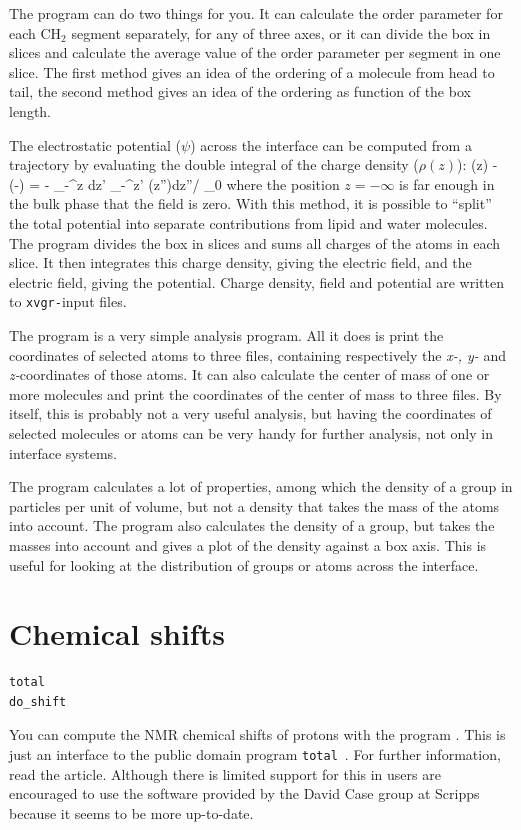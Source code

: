 {The program can do two things for you. It can calculate the order
parameter for each CH$_2$ segment separately, for any of three axes,
or it can divide the box in slices and calculate the average value of
the order parameter per segment in one slice. The first method gives
an idea of the ordering of a molecule from head to tail, the second
method gives an idea of the ordering as function of the box length.

The electrostatic potential ($\psi$) across the interface can be
computed from a trajectory by evaluating the double integral of the
charge density ($\rho(z)$):
\beq
\psi(z) - \psi(-\infty) = - \int_{-\infty}^z dz' \int_{-\infty}^{z'} \rho(z'')dz''/ \epsilon_0 
\label{eqn:elpotgr}
\eeq
where the position $z=-\infty$ is far enough in the bulk phase that
the field is zero.  With this method, it is possible to ``split'' the
total potential into separate contributions from lipid and water
molecules. The program {\tt {}} divides the box in slices and
sums all charges of the atoms in each slice. It then integrates this
charge density, giving the electric field, and the electric field,
giving the potential. Charge density, field and potential are written
to {\tt xvgr-}input files.

The program {\tt {}} is a very simple analysis program. All it
does is print the coordinates of selected atoms to three files,
containing respectively the {\em x-, y-} and {\em z-}coordinates of
those atoms. It can also calculate the center of mass of one or more
molecules and print the coordinates of the center of mass to three
files. By itself, this is probably not a very useful analysis, but
having the coordinates of selected molecules or atoms can be very
handy for further analysis, not only in interface systems.

The program {\tt {}} calculates a lot of properties, among which
the density of a group in particles per unit of volume, but not a
density that takes the mass of the atoms into account. The program
{\tt {}} also calculates the density of a group, but takes the
masses into account and gives a plot of the density against a box
axis. This is useful for looking at the distribution of groups or
atoms across the interface.


\section{Chemical shifts}
\begin{verbatim}
total
do_shift
\end{verbatim}
You can compute the NMR chemical shifts of protons with the program
{\tt {}}. This is just an {\gromacs} interface to
the public domain program {\tt total}~\cite{Williamson93a}. For
further information, read the article. Although there is limited
support for this in {\gromacs} users are encouraged to use the
software provided by the David Case group at Scripps because it seems
to be more up-to-date.

} %
